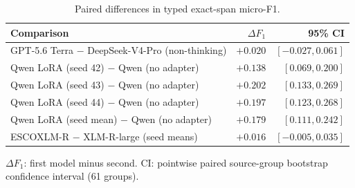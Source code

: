 \begin{table}[!htbp]
\centering\small
\caption{Paired differences in typed exact-span micro-F1.}
\label{tab:core-paired}
\begin{tabularx}{\linewidth}{@{}Lrr@{}}
\toprule Comparison & $\Delta F_1$ & 95\% CI \\\midrule
GPT-5.6 Terra $-$ DeepSeek-V4-Pro (non-thinking) & ${+0.020}$ & $[-0.027, 0.061]$ \\
Qwen LoRA (seed 42) $-$ Qwen (no adapter) & ${+0.138}$ & $[0.069, 0.200]$ \\
Qwen LoRA (seed 43) $-$ Qwen (no adapter) & ${+0.202}$ & $[0.133, 0.269]$ \\
Qwen LoRA (seed 44) $-$ Qwen (no adapter) & ${+0.197}$ & $[0.123, 0.268]$ \\
Qwen LoRA (seed mean) $-$ Qwen (no adapter) & ${+0.179}$ & $[0.111, 0.242]$ \\
ESCOXLM-R $-$ XLM-R-large (seed means) & ${+0.016}$ & $[-0.005, 0.035]$ \\
\bottomrule
\end{tabularx}
\par\smallskip\RaggedRight\footnotesize $\Delta F_1$: first model minus second. CI: pointwise paired source-group bootstrap confidence interval (61 groups).
\end{table}

